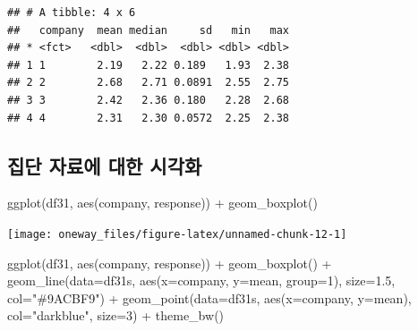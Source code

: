 \documentclass[
]{book}
\newenvironment{Shaded}{\begin{snugshade}}{\end{snugshade}}
\newcommand{\AttributeTok}[1]{\textcolor[rgb]{0.77,0.63,0.00}{#1}}
\newcommand{\DecValTok}[1]{\textcolor[rgb]{0.00,0.00,0.81}{#1}}
\newcommand{\FloatTok}[1]{\textcolor[rgb]{0.00,0.00,0.81}{#1}}
\newcommand{\FunctionTok}[1]{\textcolor[rgb]{0.00,0.00,0.00}{#1}}
\newcommand{\NormalTok}[1]{#1}
\newcommand{\SpecialCharTok}[1]{\textcolor[rgb]{0.00,0.00,0.00}{#1}}
\newcommand{\StringTok}[1]{\textcolor[rgb]{0.31,0.60,0.02}{#1}}
\begin{document}
\begin{verbatim}
## # A tibble: 4 x 6
##   company  mean median     sd   min   max
## * <fct>   <dbl>  <dbl>  <dbl> <dbl> <dbl>
## 1 1        2.19   2.22 0.189   1.93  2.38
## 2 2        2.68   2.71 0.0891  2.55  2.75
## 3 3        2.42   2.36 0.180   2.28  2.68
## 4 4        2.31   2.30 0.0572  2.25  2.38
\end{verbatim}

\hypertarget{uxc9d1uxb2e8-uxc790uxb8ccuxc5d0-uxb300uxd55c-uxc2dcuxac01uxd654-1}{%
\subsection{집단 자료에 대한 시각화}\label{uxc9d1uxb2e8-uxc790uxb8ccuxc5d0-uxb300uxd55c-uxc2dcuxac01uxd654-1}}

\begin{Shaded}
\begin{Highlighting}[]
\FunctionTok{ggplot}\NormalTok{(df31, }\FunctionTok{aes}\NormalTok{(company, response)) }\SpecialCharTok{+}  \FunctionTok{geom\_boxplot}\NormalTok{()}
\end{Highlighting}
\end{Shaded}

\begin{center}\texttt{[image: oneway\_files/figure-latex/unnamed-chunk-12-1]} \end{center}

\begin{Shaded}
\begin{Highlighting}[]
\FunctionTok{ggplot}\NormalTok{(df31, }\FunctionTok{aes}\NormalTok{(company, response)) }\SpecialCharTok{+}
  \FunctionTok{geom\_boxplot}\NormalTok{() }\SpecialCharTok{+} 
  \FunctionTok{geom\_line}\NormalTok{(}\AttributeTok{data=}\NormalTok{df31s, }\FunctionTok{aes}\NormalTok{(}\AttributeTok{x=}\NormalTok{company, }\AttributeTok{y=}\NormalTok{mean, }\AttributeTok{group=}\DecValTok{1}\NormalTok{), }\AttributeTok{size=}\FloatTok{1.5}\NormalTok{, }\AttributeTok{col=}\StringTok{"\#9ACBF9"}\NormalTok{) }\SpecialCharTok{+}
  \FunctionTok{geom\_point}\NormalTok{(}\AttributeTok{data=}\NormalTok{df31s, }\FunctionTok{aes}\NormalTok{(}\AttributeTok{x=}\NormalTok{company, }\AttributeTok{y=}\NormalTok{mean), }\AttributeTok{col=}\StringTok{"darkblue"}\NormalTok{, }\AttributeTok{size=}\DecValTok{3}\NormalTok{) }\SpecialCharTok{+}
  \FunctionTok{theme\_bw}\NormalTok{()}
\end{Highlighting}
\end{Shaded}
\end{document}
